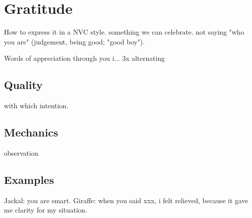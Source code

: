 \chapter{Gratitude}\label{ch:gratitude}





How to express it in a NVC style.
something we can celebrate.
not saying "who you are" (judgement, being good; "good boy").


\begin{exercise}{Words of appreciation}
    through you i...
    3x
    alternating
\end{exercise}

\section{Quality}
with which intention.

\section{Mechanics}
observation

\section{Examples}

Jackal: you are smart.
Giraffe: when you said xxx, i felt relieved, because it gave me clarity for my situation.
